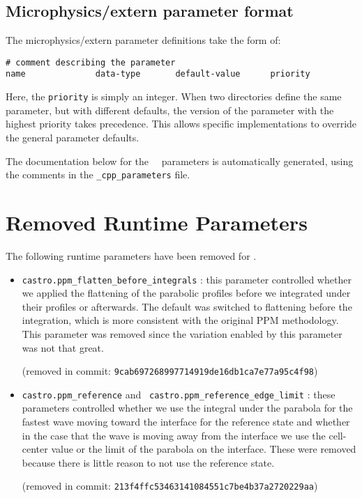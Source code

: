 \subsection{Microphysics/extern parameter format}

The microphysics/extern parameter definitions take the form of:
\begin{verbatim}
# comment describing the parameter
name              data-type       default-value      priority
\end{verbatim}
Here, the {\tt priority} is simply an integer.  When two directories
define the same parameter, but with different defaults, the version of
the parameter with the highest priority takes precedence.  This allows
specific implementations to override the general parameter defaults.

The documentation below for the \castro\ \cpp\ parameters is
automatically generated, using the comments in the {\tt \_cpp\_parameters}
file.



\section{Removed Runtime Parameters}

The following runtime parameters have been removed for \castro.
\begin{itemize}
\item {\tt castro.ppm\_flatten\_before\_integrals} : this parameter
  controlled whether we applied the flattening of the parabolic
  profiles before we integrated under their profiles or afterwards.
  The default was switched to flattening before the integration,
  which is more consistent with the original PPM methodology.  This
  parameter was removed since the variation enabled by this parameter
  was not that great. 

  (removed in commit: {\tt 9cab697268997714919de16db1ca7e77a95c4f98})


\item {\tt castro.ppm\_reference} and {\tt
  castro.ppm\_reference\_edge\_limit} : these parameters controlled
  whether we use the integral under the parabola for the fastest wave
  moving toward the interface for the reference state and whether in
  the case that the wave is moving away from the interface we use the
  cell-center value or the limit of the parabola on the interface.
  These were removed because there is little reason to not use the
  reference state.

  (removed in commit: {\tt 213f4ffc53463141084551c7be4b37a2720229aa})
\end{itemize}

